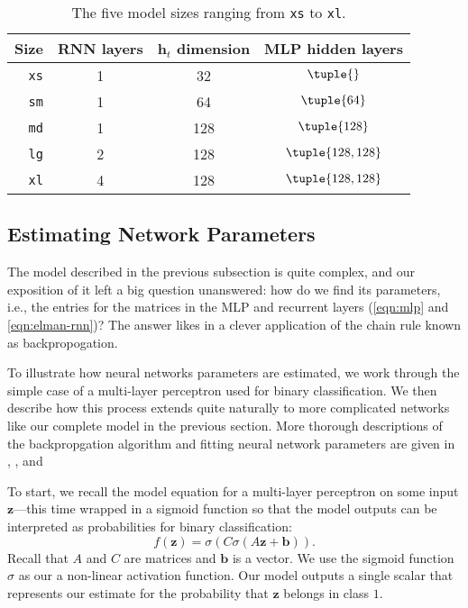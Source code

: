 \begin{table}
	\begin{tabular}{r ccc}
		\hline
		Size        & RNN layers & $\mathbf h_t$ dimension & MLP hidden layers  \\
		\hline
		\texttt{xs} & 1          & 32                      & $\tuple{}$         \\
		\texttt{sm} & 1          & 64                      & $\tuple{64}$       \\
		\texttt{md} & 1          & 128                     & $\tuple{128}$      \\
		\texttt{lg} & 2          & 128                     & $\tuple{128, 128}$ \\
		\texttt{xl} & 4          & 128                     & $\tuple{128, 128}$ \\
		\hline
	\end{tabular}
	\caption{The five model sizes ranging from \texttt{xs} to \texttt{xl}.}
	\label{tbl:model-sizes}
\end{table}

\subsection{Estimating Network Parameters}

The model described in the previous subsection is quite complex, and our exposition of it left a big question unanswered: how do we find its parameters, i.e., the entries for the matrices in the MLP and recurrent layers (\autoref{eqn:mlp} and \autoref{eqn:elman-rnn})? The answer likes in a clever application of the chain rule known as backpropogation.

To illustrate how neural networks parameters are estimated, we work through the simple case of a multi-layer perceptron used for binary classification. We then describe how this process extends quite naturally to more complicated networks like our complete model in the previous section. More thorough descriptions of the backpropgation algorithm and fitting neural network parameters are given in \textcite[\S 13.4]{PML}, \textcite[\S 11.4]{ESL}, and \textcite[\S 10.7]{ISL}

To start, we recall the model equation for a multi-layer perceptron on some input $\mathbf z$---this time wrapped in a sigmoid function so that the model outputs can be interpreted as probabilities for binary classification:
\begin{equation}
	f(\mathbf z) = \sigma (C \sigma (A\mathbf z + \mathbf b)).
\end{equation}
Recall that $A$ and $C$ are matrices and $\mathbf b$ is a vector. We use the sigmoid function $\sigma$ as our a non-linear activation function. Our model outputs a single scalar that represents our estimate for the probability that $\mathbf z$ belongs in class $1$.

